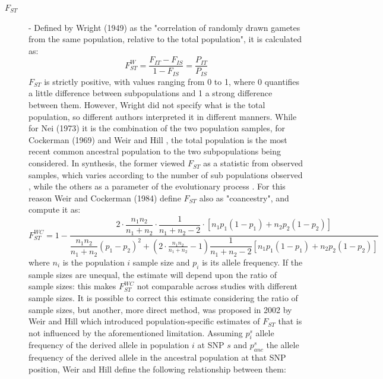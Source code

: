 \documentclass[a4paper, 12pt]{report}
\begin{document}
\begin{description}
	\item[\textbf{$F_{ST}$}] - Defined by Wright (1949) as the "correlation of randomly drawn gametes from the same population, relative to the total population", it is calculated as:
	\begin{equation}\label{wright}
		F_{ST}^W = \dfrac{F_{IT}-F_{IS}}{1-F_{IS}} = \dfrac{P_{IT}}{P_{IS}}
	\end{equation}
	$F_{ST}$ is strictly positive, with values ranging from 0 to 1, where 0 quantifies a little difference between subpopulations and 1 a strong difference between them. However, Wright did not specify what is the total population, so different authors interpreted it in different manners. While for Nei (1973) it is the combination of the two population samples, for Cockerman (1969) and Weir and Hill \parencite{weirEstimatingFStatistics2002}, the total population is the most recent common ancestral population to the two subpopulations being considered. In synthesis, the former viewed $F_{ST}$ as a statistic from observed samples, which varies according to the number of sub populations observed \parencite{weirEstimatingFStatisticsAnalysis1984}, while the others as a parameter of the evolutionary process \parencite{bhatiaEstimatingInterpretingFST2013}. For this reason Weir and Cockerman (1984) define $F_{ST}$ also as "coancestry", and compute it as: 
	\begin{equation}\label{WC}
		F_{ST}^{WC} = 1- 
		\dfrac{
			2 
			\cdot
			\dfrac{n_1n_2}{n_1+n_2} 
			\cdot
			\dfrac{1}{n_1+n_2-2}
			\cdot
			[n_1p_1(1-p_1)+n_2p_2(1-p_2)]
		}
		{
		\dfrac{n_1n_2}{n_1+n_2}(p_1-p_2)^2
		+
		\left ( 2 \cdot 
		\frac{n_1n_2}{n_1+n_2}-1
		\right )
		\dfrac{1}{n_1+n_2-2}
		[n_1p_1(1-p_1)+n_2p_2(1-p_2)]
		}
	\end{equation} where $n_i$ is the population $i$ sample size and $p_i$ is its allele frequency. If the sample sizes are unequal, the estimate will depend upon the ratio of sample sizes: this makes $F_{ST}^{WC}$ not comparable across studies with different sample sizes. It is possible to correct this estimate considering the ratio of sample sizes, but another, more direct method, was proposed in 2002 by Weir and Hill \parencite{weirEstimatingFStatistics2002} which introduced population-specific estimates of $F_{ST}$ that is not influenced by the aforementioned limitation. Assuming $p_i^s$ allele frequency of the derived allele in population $i$ at SNP $s$ and $p_{anc}^s$ the allele frequency of the derived allele in the ancestral population at that SNP position, Weir and Hill define the following relationship between them:

\end{description}
\end{document}
